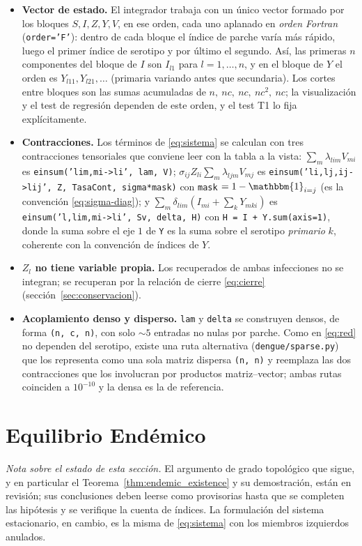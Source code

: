 \documentclass{article}
\numberwithin{equation}{section}
\begin{document}
\begin{itemize}
\item \textbf{Vector de estado.} El integrador trabaja con un único vector formado por los bloques $S, I, Z, Y, V$, en ese orden, cada uno aplanado en \emph{orden Fortran} (\texttt{order='F'}): dentro de cada bloque el índice de parche varía más rápido, luego el primer índice de serotipo y por último el segundo. Así, las primeras $n$ componentes del bloque de $I$ son $I_{l1}$ para $l=1,\dots,n$, y en el bloque de $Y$ el orden es $Y_{l11}, Y_{l21}, \dots$ (primaria variando antes que secundaria). Los cortes entre bloques son las sumas acumuladas de $n,\ nc,\ nc,\ nc^2,\ nc$; la visualización y el test de regresión dependen de este orden, y el test T1 lo fija explícitamente.
\item \textbf{Contracciones.} Los términos de \eqref{eq:sistema} se calculan con tres contracciones tensoriales que conviene leer con la tabla a la vista: $\sum_m\lambda_{lim}V_{mi}$ es \texttt{einsum('lim,mi->li', lam, V)}; $\sigma_{ij}Z_{li}\sum_m\lambda_{ljm}V_{mj}$ es \texttt{einsum('li,lj,ij->lij', Z, TasaCont, sigma*mask)} con \texttt{mask} $=1-\mathbbm{1}_{i=j}$ (es la convención \eqref{eq:sigma-diag}); y $\sum_m\delta_{lim}(I_{mi}+\sum_k Y_{mki})$ es \texttt{einsum('l,lim,mi->li', Sv, delta, H)} con \texttt{H = I + Y.sum(axis=1)}, donde la suma sobre el eje $1$ de \texttt{Y} es la suma sobre el serotipo \emph{primario} $k$, coherente con la convención de índices de $Y$.
\item \textbf{$Z_l$ no tiene variable propia.} Los recuperados de ambas infecciones no se integran; se recuperan por la relación de cierre \eqref{eq:cierre} (sección~\ref{sec:conservacion}).
\item \textbf{Acoplamiento denso y disperso.} \texttt{lam} y \texttt{delta} se construyen densos, de forma \texttt{(n, c, n)}, con solo $\sim 5$ entradas no nulas por parche. Como en \eqref{eq:red} no dependen del serotipo, existe una ruta alternativa (\texttt{dengue/sparse.py}) que los representa como una sola matriz dispersa \texttt{(n, n)} y reemplaza las dos contracciones que los involucran por productos matriz--vector; ambas rutas coinciden a $10^{-10}$ y la densa es la de referencia.
\end{itemize}

\section{Equilibrio Endémico}
\emph{Nota sobre el estado de esta sección.} El argumento de grado topológico que sigue, y en particular el Teorema~\ref{thm:endemic_existence} y su demostración, están en revisión; sus conclusiones deben leerse como provisorias hasta que se completen las hipótesis y se verifique la cuenta de índices. La formulación del sistema estacionario, en cambio, es la misma de \eqref{eq:sistema} con los miembros izquierdos anulados.
\end{document}
